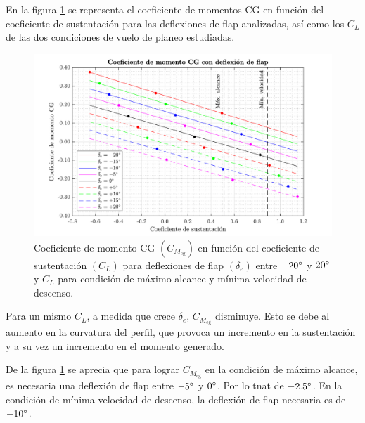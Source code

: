 En la figura \ref{fig:cmcg_flap} se representa el coeficiente de momentos CG en función del coeficiente de sustentación para las deflexiones de flap analizadas, así como los $C_L$ de las dos condiciones de vuelo de planeo estudiadas.
\begin{figure}[h]
    \centering
    \includegraphics[width=\linewidth]{imagenes/control_flaps/cmcg_flap.pdf}
    \caption{Coeficiente de momento CG $( C_{M_{\text{cg}}} )$ en función del coeficiente de sustentación $\left( C_L \right)$ para deflexiones de flap $\left( \delta_e \right)$ entre $-20\mathrm{^{\circ}}$ y $20\mathrm{^{\circ}}$ y $C_L$ para condición de máximo alcance y mínima velocidad de descenso.}
    \label{fig:cmcg_flap}
    \vspace{-4mm}
\end{figure}

\noindent
Para un mismo $C_L$, a medida que crece $\delta_e$, $C_{M_\text{cg}}$ disminuye. Esto se debe al aumento en la curvatura del perfil, que provoca un incremento en la sustentación y a su vez un incremento en el momento generado.

De la figura \ref{fig:cmcg_flap} se aprecia que para lograr $C_{M_{\text{cg}}}$ en la condición de máximo alcance, es necesaria una deflexión de flap entre $-5\mathrm{^{\circ}}$ y $0\mathrm{^{\circ}}$. Por lo tnat de $-2.5\mathrm{^{\circ}}$. En la condición de mínima velocidad de descenso, la deflexión de flap necesaria es de $-10\mathrm{^{\circ}}$.

